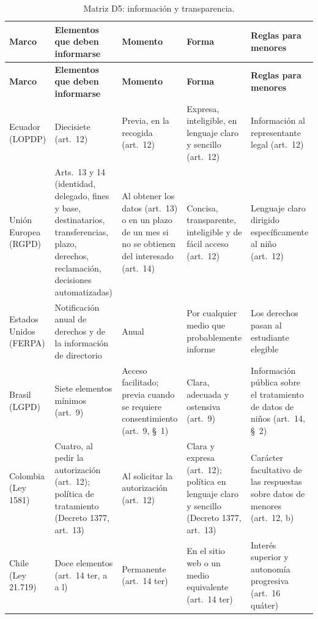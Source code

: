{\scriptsize
\renewcommand{\arraystretch}{1.12}
\begin{xltabular}{\textwidth}{|>{\raggedright\arraybackslash}p{2.0cm}|L|L|L|L|}
  \caption{Matriz D5: información y transparencia.}
  \label{tab:matriz_d5} \\
  \hline
  \textbf{Marco} & \textbf{Elementos que deben informarse} & \textbf{Momento} & \textbf{Forma} & \textbf{Reglas para menores} \\
  \hline
  \endfirsthead
  \hline
  \textbf{Marco} & \textbf{Elementos que deben informarse} & \textbf{Momento} & \textbf{Forma} & \textbf{Reglas para menores} \\
  \hline
  \endhead
  \hline
  \endlastfoot
  Ecuador (LOPDP) & Diecisiete (art.~12) & Previa, en la recogida (art.~12) & Expresa, inteligible, en lenguaje claro y sencillo (art.~12) & Información al representante legal (art.~12) \\ \hline
  Unión Europea (RGPD) & Arts.~13 y 14 (identidad, delegado, fines y base, destinatarios, transferencias, plazo, derechos, reclamación, decisiones automatizadas) & Al obtener los datos (art.~13) o en un plazo de un mes si no se obtienen del interesado (art.~14) & Concisa, transparente, inteligible y de fácil acceso (art.~12) & Lenguaje claro dirigido específicamente al niño (art.~12) \\ \hline
  Estados Unidos (FERPA) & Notificación anual de derechos y de la información de directorio \cite{ferpa34cfr} & Anual & Por cualquier medio que probablemente informe \cite[§~99.7]{ferpa34cfr} & Los derechos pasan al estudiante elegible \cite[§~99.5]{ferpa34cfr} \\ \hline
  Brasil (LGPD) & Siete elementos mínimos (art.~9) & Acceso facilitado; previa cuando se requiere consentimiento (art.~9, §~1) & Clara, adecuada y ostensiva (art.~9) & Información pública sobre el tratamiento de datos de niños (art.~14, §~2) \\ \hline
  Colombia (Ley 1581) & Cuatro, al pedir la autorización (art.~12); política de tratamiento (Decreto 1377, art.~13) & Al solicitar la autorización (art.~12) & Clara y expresa (art.~12); política en lenguaje claro y sencillo (Decreto 1377, art.~13) & Carácter facultativo de las respuestas sobre datos de menores (art.~12, b) \\ \hline
  Chile (Ley 21.719) & Doce elementos (art.~14 ter, a a l) & Permanente (art.~14 ter) & En el sitio web o un medio equivalente (art.~14 ter) & Interés superior y autonomía progresiva (art.~16 quáter) \\ \hline
\end{xltabular}
}

